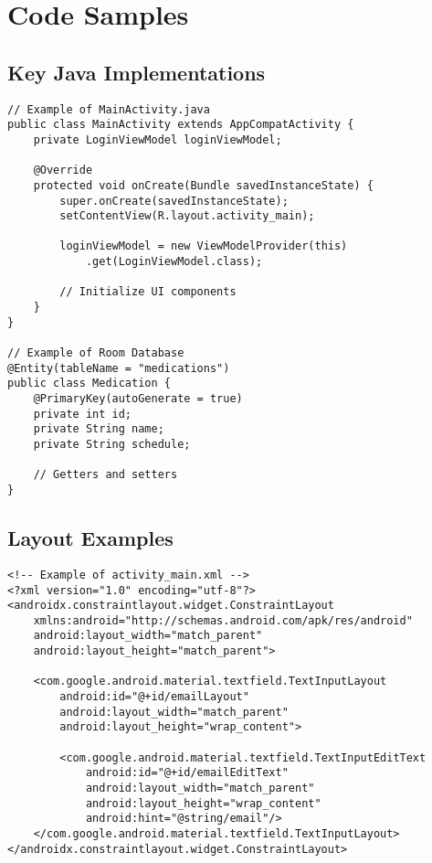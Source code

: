 \appendix
\chapter{Code Samples}
\section{Key Java Implementations}
\begin{verbatim}
// Example of MainActivity.java
public class MainActivity extends AppCompatActivity {
    private LoginViewModel loginViewModel;
    
    @Override
    protected void onCreate(Bundle savedInstanceState) {
        super.onCreate(savedInstanceState);
        setContentView(R.layout.activity_main);
        
        loginViewModel = new ViewModelProvider(this)
            .get(LoginViewModel.class);
            
        // Initialize UI components
    }
}

// Example of Room Database
@Entity(tableName = "medications")
public class Medication {
    @PrimaryKey(autoGenerate = true)
    private int id;
    private String name;
    private String schedule;
    
    // Getters and setters
}
\end{verbatim}

\section{Layout Examples}
\begin{verbatim}
<!-- Example of activity_main.xml -->
<?xml version="1.0" encoding="utf-8"?>
<androidx.constraintlayout.widget.ConstraintLayout
    xmlns:android="http://schemas.android.com/apk/res/android"
    android:layout_width="match_parent"
    android:layout_height="match_parent">
    
    <com.google.android.material.textfield.TextInputLayout
        android:id="@+id/emailLayout"
        android:layout_width="match_parent"
        android:layout_height="wrap_content">
        
        <com.google.android.material.textfield.TextInputEditText
            android:id="@+id/emailEditText"
            android:layout_width="match_parent"
            android:layout_height="wrap_content"
            android:hint="@string/email"/>
    </com.google.android.material.textfield.TextInputLayout>
</androidx.constraintlayout.widget.ConstraintLayout>
\end{verbatim}

 